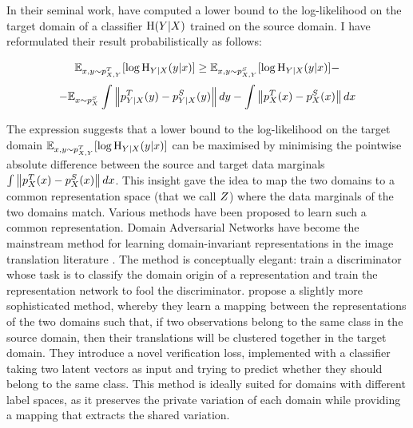 \documentclass[../thesis.tex]{subfiles}
\begin{document}
In their seminal work, \citet{ben2010theory} have computed a lower bound to the log-likelihood on the target domain of a classifier $\mathrm{H}(\myrv{y} | \myrv{x})$ trained on the source domain. I have reformulated their result probabilistically as follows:

\[
 \mathbb{E}_{\myvect{x}, y \sim \myfunc{p}^T_{\myrv{x}, \myrv{y}}} [\log \mathrm{H}_{\myrv{y} | \myrv{x}} (y | \myvect{x})] \geq \mathbb{E}_{\myvect{x}, y \sim \myfunc{p}^S_{\myrv{x}, \myrv{y}}} [\log \mathrm{H}_{\myrv{y} | \myrv{x}} (y | \myvect{x})] - 
\]
\[
 - \mathbb{E}_{\myvect{x} \sim \myfunc{p}^S_{\myrv{x}}} \int \left\| \myfunc{p}^T_{\myrv{y} | \myrv{x}} (y) - \myfunc{p}^S_{\myrv{y} | \myrv{x}} (y) \right\| dy - \int \left\| \myfunc{p}^T_{\myrv{x}} (\myvect{x}) - \myfunc{p}^S_{\myrv{x}} (\myvect{x}) \right\| d\myvect{x}
\]

The expression suggests that a lower bound to the log-likelihood on the target domain $\mathbb{E}_{\myvect{x}, y \sim \myfunc{p}^T_{\myrv{x}, \myrv{y}}} [\log \mathrm{H}_{\myrv{y} | \myrv{x}} (y | \myvect{x})]$ can be maximised by minimising the pointwise absolute difference between the source and target data marginals $\int \left\| \myfunc{p}^T_{\myrv{x}} (\myvect{x}) - \myfunc{p}^S_{\myrv{x}} (\myvect{x}) \right\| d\myvect{x}$. This insight gave \citet{ben2010theory} the idea to map the two domains to a common representation space (that we call $\myrv{z}$) where the data marginals of the two domains match. Various methods have been proposed to learn such a common representation. Domain Adversarial Networks have become the mainstream method for learning domain-invariant representations in the image translation literature \citep{ganin2015unsupervised, ganin2016domain}. The method is conceptually elegant: train a discriminator \citep{goodfellow2014generative} whose task is to classify the domain origin of a representation and train the representation network to fool the discriminator. \citet{sohn2018unsupervised} propose a slightly more sophisticated method, whereby they learn a mapping between the representations of the two domains such that, if two observations belong to the same class in the source domain, then their translations will be clustered together in the target domain. They introduce a novel verification loss, implemented with a classifier taking two latent vectors as input and trying to predict whether they should belong to the same class. This method is ideally suited for domains with different label spaces, as it preserves the private variation of each domain while providing a mapping that extracts the shared variation.
\end{document}
